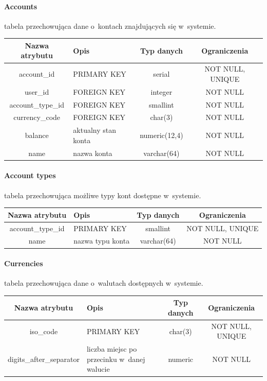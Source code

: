 \paragraph{Accounts} tabela przechowująca dane o~kontach znajdujących się w~systemie.\\

\begin{tabular}{| c | p{4cm} | c | c |}
  \hline \textbf{Nazwa atrybutu} & \textbf{Opis} & \textbf{Typ danych} & \textbf{Ograniczenia} \\ \hline
  account\_id & PRIMARY KEY & serial & NOT NULL, UNIQUE \\ \hline
  user\_id & FOREIGN KEY & integer & NOT NULL \\ \hline
  account\_type\_id & FOREIGN KEY & smallint & NOT NULL \\ \hline
  currency\_code & FOREIGN KEY & char(3) & NOT NULL \\ \hline
  balance & aktualny stan konta & numeric(12,4) & NOT NULL \\ \hline
  name & nazwa konta & varchar(64) & NOT NULL \\ \hline
\end{tabular}

\paragraph{Account types} tabela przechowująca możliwe typy kont dostępne w~systemie.\\

\begin{tabular}{| c | p{4cm} | c | c |}
  \hline \textbf{Nazwa atrybutu} & \textbf{Opis} & \textbf{Typ danych} & \textbf{Ograniczenia} \\ \hline
  account\_type\_id & PRIMARY KEY & smallint & NOT NULL, UNIQUE \\ \hline
  name & nazwa typu konta & varchar(64) & NOT NULL \\ \hline
\end{tabular}

\paragraph{Currencies} tabela przechowująca dane o~walutach dostępnych w~systemie.\\

\begin{tabular}{| c | p{4cm} | c | c |}
  \hline \textbf{Nazwa atrybutu} & \textbf{Opis} & \textbf{Typ danych} & \textbf{Ograniczenia} \\ \hline
  iso\_code & PRIMARY KEY & char(3) & NOT NULL, UNIQUE \\ \hline
  digits\_after\_separator & liczba miejsc po przecinku w~danej walucie & numeric & NOT NULL \\ \hline
\end{tabular}

